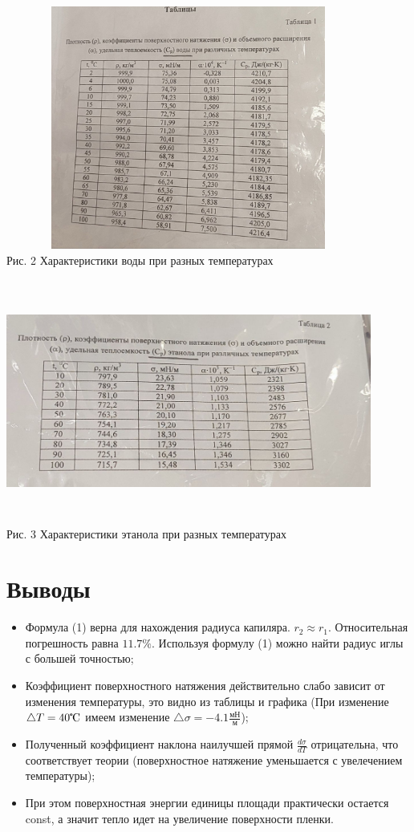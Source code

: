 \documentclass[a4paper, 12pt]{article}
\begin{document}
	\begin{center}
		\includegraphics[width= 12cm, height= 8cm]{"Таблица1.jpg"}\\
		Рис. 2 Характеристики воды при разных температурах
	\end{center}

	\begin{center}
	\includegraphics[width= 12cm, height= 8cm]{"Таблица2.jpg"}\\
	Рис. 3 Характеристики этанола при разных температурах
	\end{center}
	
	\section{Выводы}
	\begin{itemize}
		\item Формула (1) верна для нахождения радиуса капиляра. $r_2 \approx r_1$. Относительная погрешность равна $11.7\%$. Используя формулу (1) можно найти радиус иглы с большей точностью;
		\item Коэффициент поверхностного натяжения действительно слабо зависит от изменения температуры, это видно из таблицы и графика (При изменение $\bigtriangleup T = 40 \tccelsius$ имеем изменение $\bigtriangleup \sigma = -4.1 \frac{\text{мН}}{\text{м}}$);
		\item Полученный коэффициент наклона наилучшей прямой $\frac{d \sigma}{dT}$ отрицательна, что соответствует теории (поверхностное натяжение уменьшается с увелечением температуры);
		\item При этом поверхностная энергии единицы площади практически остается const, а значит тепло идет на увеличение поверхности пленки.
	\end{itemize}
	
\end{document}
